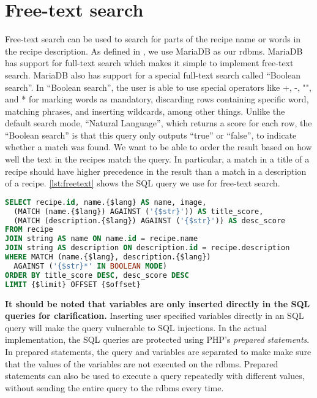 \section{Free-text search}
Free-text search can be used to search for parts of the recipe name or words in the recipe description. As defined in , we use MariaDB as our \ac{rdbms}. MariaDB has support for full-text search which makes it simple to implement free-text search. MariaDB also has support for a special full-text search called ``Boolean search''.\cite{mariafulltext} In ``Boolean search'', the user is able to use special operators like  +, -, "", and *  for marking words as mandatory, discarding rows containing specific word, matching phrases, and inserting wildcards, among other things. Unlike the default search mode, ``Natural Language'', which returns a score for each row, the ``Boolean search'' is that this query only outputs ``true'' or ``false'', to indicate whether a match was found. We want to be able to order the result based on how well the text in the recipes match the query. In particular, a match in a title of a recipe should have higher precedence in the result than a match in a description of a recipe.
\autoref{lst:freetext} shows the SQL query we use for free-text search.

\begin{lstlisting}[language=SQL, morekeywords={AGAINST,OFFSET,BOOLEAN,MODE}, float=h, label={lst:freetext}, caption={Free-text search.}]
SELECT recipe.id, name.{$lang} AS name, image,
  (MATCH (name.{$lang}) AGAINST ('{$str}')) AS title_score,
  (MATCH (description.{$lang}) AGAINST ('{$str}')) AS desc_score
FROM recipe
JOIN string AS name ON name.id = recipe.name
JOIN string AS description ON description.id = recipe.description
WHERE MATCH (name.{$lang}, description.{$lang})
  AGAINST ('{$str}*' IN BOOLEAN MODE)
ORDER BY title_score DESC, desc_score DESC
LIMIT {$limit} OFFSET {$offset}
\end{lstlisting}
\textbf{It should be noted that variables are only inserted directly in the SQL queries for clarification.} Inserting user specified variables directly in an SQL query will make the query vulnerable to SQL injections. In the actual implementation, the SQL queries are protected using PHP's \textit{prepared statements}. In prepared statements, the query and variables are separated to make make sure that the values of the variables are not executed on the \ac{rdbms}. Prepared statements can also be used to execute a query repeatedly with different values, without sending the entire query to the \ac{rdbms} every time.

